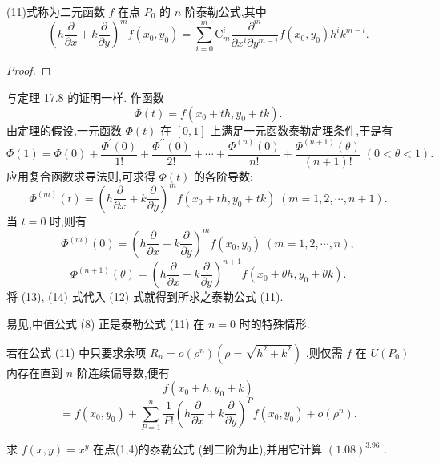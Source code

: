 (11)式称为二元函数 \(f\) 在点 \({P}_{0}\) 的 \(n\) 阶泰勒公式,其中
\[
{\left( h\frac{\partial }{\partial x} + k\frac{\partial }{\partial y}\right) }^{m}f\left( {{x}_{0},{y}_{0}}\right)  = \mathop{\sum }\limits_{{i = 0}}^{m}{\mathrm{C}}_{m}^{i}\frac{{\partial }^{m}}{\partial {x}^{i}\partial {y}^{m - i}}f\left( {{x}_{0},{y}_{0}}\right) {h}^{i}{k}^{m - i}.
\]
\begin{proof}

\end{proof}
与定理 17.8 的证明一样. 作函数
\[
\Phi \left( t\right)  = f\left( {{x}_{0} + {th},{y}_{0} + {tk}}\right) .
\]
由定理的假设,一元函数 \(\Phi \left( t\right)\) 在 \(\left\lbrack  {0,1}\right\rbrack\) 上满足一元函数泰勒定理条件,于是有
\[
\Phi \left( 1\right)  = \Phi \left( 0\right)  + \frac{{\Phi }^{\prime }\left( 0\right) }{1!} + \frac{{\Phi }^{\prime \prime }\left( 0\right) }{2!} + \cdots  + \frac{{\Phi }^{\left( n\right) }\left( 0\right) }{n!} + \frac{{\Phi }^{\left( n + 1\right) }\left( \theta \right) }{\left( {n + 1}\right) !}\;\left( {0 < \theta  < 1}\right) . \tag{12}
\]
应用复合函数求导法则,可求得 \(\Phi \left( t\right)\) 的各阶导数:
\[
{\Phi }^{\left( m\right) }\left( t\right)  = {\left( h\frac{\partial }{\partial x} + k\frac{\partial }{\partial y}\right) }^{m}f\left( {{x}_{0} + {th},{y}_{0} + {tk}}\right) \;\left( {m = 1,2,\cdots ,n + 1}\right) .
\]
当 \(t = 0\) 时,则有
\[
{\Phi }^{\left( m\right) }\left( 0\right)  = {\left( h\frac{\partial }{\partial x} + k\frac{\partial }{\partial y}\right) }^{m}f\left( {{x}_{0},{y}_{0}}\right) \;\left( {m = 1,2,\cdots ,n}\right) , \tag{13}
\]
\[
{\Phi }^{\left( n + 1\right) }\left( \theta \right)  = {\left( h\frac{\partial }{\partial x} + k\frac{\partial }{\partial y}\right) }^{n + 1}f\left( {{x}_{0} + {\theta h},{y}_{0} + {\theta k}}\right) . \tag{14}
\]
将 (13), (14) 式代入 (12) 式就得到所求之泰勒公式 (11).

易见,中值公式 (8) 正是泰勒公式 (11) 在 \(n = 0\) 时的特殊情形.

若在公式 (11) 中只要求余项 \({R}_{n} = o\left( {\rho }^{n}\right) \left( {\rho  = \sqrt{{h}^{2} + {k}^{2}}}\right)\) ,则仅需 \(f\) 在 \(U\left( {P}_{0}\right)\) 内存在直到 \(n\) 阶连续偏导数,便有
\[
f\left( {{x}_{0} + h,{y}_{0} + k}\right)
\]
\[
= f\left( {{x}_{0},{y}_{0}}\right)  + \mathop{\sum }\limits_{{P = 1}}^{n}\frac{1}{P!}{\left( h\frac{\partial }{\partial x} + k\frac{\partial }{\partial y}\right) }^{P}f\left( {{x}_{0},{y}_{0}}\right)  + o\left( {\rho }^{n}\right) . \tag{15}
\]
\begin{example}

\end{example}
求 \(f\left( {x,y}\right)  = {x}^{y}\) 在点(1,4)的泰勒公式 (到二阶为止),并用它计算 \({\left( {1.08}\right) }^{3.96}\) .

